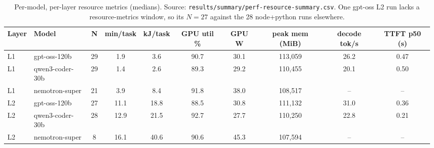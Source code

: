 \documentclass[10pt,twocolumn]{article}
\newcommand{\code}[1]{\texttt{\small #1}}
\begin{document}
\begin{table}[t]
\centering
\caption{Per-model, per-layer resource metrics (medians). Source:
\code{results/summary/perf-resource-summary.csv}. One gpt-oss L2 run lacks a resource-metrics
window, so its $N{=}27$ against the 28 node+python runs elsewhere.}
\label{tab:resource}
\footnotesize
\setlength{\tabcolsep}{4pt}
\begin{tabular}{@{}llcccccccc@{}}
\toprule
Layer & Model & N & min/task & kJ/task & GPU util \% & GPU W & peak mem (MiB) & decode tok/s & TTFT p50 (s) \\
\midrule
L1 & gpt-oss-120b    & 29 & 1.9 & 3.6 & 90.7 & 30.1 & 113{,}059 & 26.2 & 0.47 \\
L1 & qwen3-coder-30b & 29 & 1.4 & 2.6 & 89.3 & 29.2 & 110{,}455 & 20.1 & 0.50 \\
L1 & nemotron-super  & 21 & 3.9 & 8.4 & 91.8 & 38.0 & 108{,}517 & --   & --   \\
L2 & gpt-oss-120b    & 27 & 11.1 & 18.8 & 88.5 & 30.8 & 111{,}132 & 31.0 & 0.36 \\
L2 & qwen3-coder-30b & 28 & 12.9 & 21.5 & 92.7 & 27.7 & 110{,}250 & 22.8 & 0.21 \\
L2 & nemotron-super  &  8 & 16.1 & 40.6 & 90.6 & 45.3 & 107{,}594 & --   & --   \\
\bottomrule
\end{tabular}
\end{table}
\end{document}

